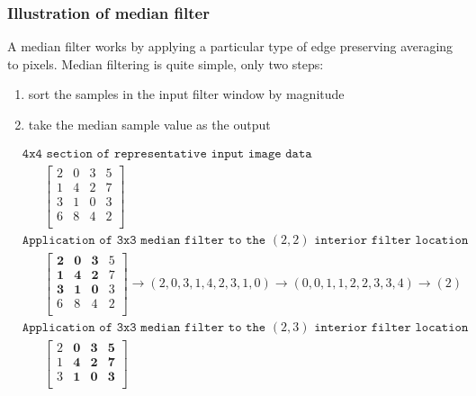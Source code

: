 \documentclass[11pt,fleqn]{article}
\begin{document}
\newpage
\subsubsection{Illustration of median filter}

A median filter works by applying a particular type of edge preserving averaging to pixels. Median filtering is quite simple, only two steps:
\begin{enumerate}
\item sort the samples in the input filter window by magnitude
\item take the median sample value as the output
\end{enumerate}
%
\begin{equation*}
\begin{aligned}
&\texttt{4x4 section of representative input image data}\\
& \hspace{20pt} \begin{bmatrix}
2 & 0 & 3 & 5 \\
1 & 4 & 2 & 7 \\
3 & 1 & 0 & 3 \\
6 & 8 & 4 & 2 \\ 
\end{bmatrix} \\[10pt]
%
& \texttt{Application of 3x3 median filter to the $(2,2)$ interior filter location}\\
& \hspace{20pt} \begin{bmatrix}
\mathbf{2} & \mathbf{0} & \mathbf{3} & 5 \\
\mathbf{1} & \mathbf{4} & \mathbf{2} & 7 \\
\mathbf{3} & \mathbf{1} & \mathbf{0} & 3 \\
6 & 8 & 4 & 2 \\ 
\end{bmatrix} 
\rightarrow (2, 0, 3, 1, 4, 2, 3, 1, 0) \rightarrow (0, 0, 1, 1, 2, 2, 3, 3, 4) \rightarrow (2) \\[10pt]
%
& \texttt{Application of 3x3 median filter to the $(2,3)$ interior filter location}\\
& \hspace{20pt} \begin{bmatrix}
2 & \mathbf{0} & \mathbf{3} & \mathbf{5} \\
1 & \mathbf{4} & \mathbf{2} & \mathbf{7} \\
3 & \mathbf{1} & \mathbf{0} & \mathbf{3} \\

\end{bmatrix}
\end{aligned}
\end{equation*}
\end{document}
